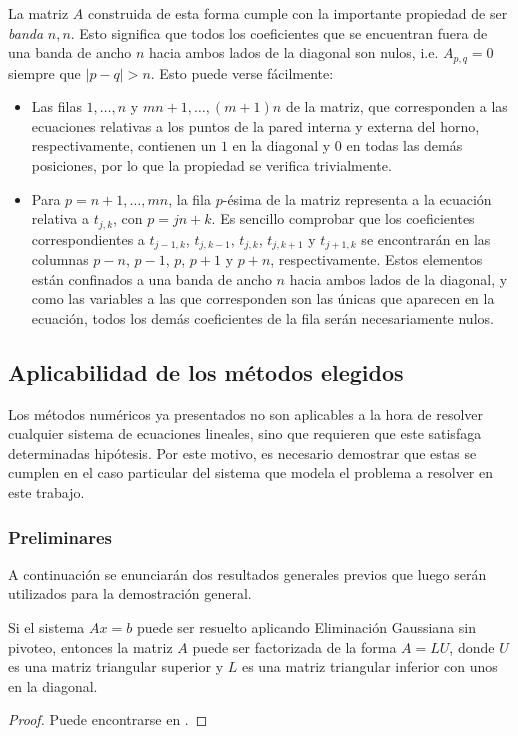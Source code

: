      La matriz $A$ construida de esta forma cumple con la importante propiedad de ser \emph{banda} $n, n$. Esto significa que todos los coeficientes que se encuentran fuera de una banda de ancho $n$ hacia ambos lados de la diagonal son nulos, i.e. $A_{p,q} = 0$ siempre que $\vert p - q \vert > n$. Esto puede verse fácilmente:

      \begin{itemize}
        \item Las filas $1, \dots, n$ y $mn + 1, \dots, (m+1)n$ de la matriz, que corresponden a las ecuaciones relativas a los puntos de la pared interna y externa del horno, respectivamente, contienen un $1$ en la diagonal y $0$ en todas las demás posiciones, por lo que la propiedad se verifica trivialmente.
        \item Para $p = n + 1, \dots, mn$, la fila $p$-ésima de la matriz representa a la ecuación relativa a $t_{j,k}$, con $p = jn+k$. Es sencillo comprobar que los coeficientes correspondientes a $t_{j-1,k}$, $t_{j,k-1}$, $t_{j,k}$, $t_{j,k+1}$ y $t_{j+1,k}$ se encontrarán en las columnas $p-n$, $p-1$, $p$, $p+1$ y $p+n$, respectivamente. Estos elementos están confinados a una banda de ancho $n$ hacia ambos lados de la diagonal, y como las variables a las que corresponden son las únicas que aparecen en la ecuación, todos los demás coeficientes de la fila serán necesariamente nulos.
      \end{itemize}

  \subsection{Aplicabilidad de los métodos elegidos}

    Los métodos numéricos ya presentados no son aplicables a la hora de resolver cualquier sistema de ecuaciones lineales, sino que requieren que este satisfaga determinadas hipótesis. Por este motivo, es necesario demostrar que estas se cumplen en el caso particular del sistema que modela el problema a resolver en este trabajo.

    \subsubsection{Preliminares}

        A continuación se enunciarán dos resultados generales previos que luego serán utilizados para la demostración general.

        \begin{prop} \label{prop:EG sin pivoteo implica LU}
          Si el sistema $Ax=b$ puede ser resuelto aplicando Eliminación Gaussiana sin pivoteo, entonces la matriz $A$ puede ser factorizada de la forma $A=LU$, donde $U$ es una matriz triangular superior y $L$ es una matriz triangular inferior con unos en la diagonal.
        \end{prop}
        \begin{proof}
            Puede encontrarse en \cite[p.~403]{burden}.
        \end{proof}

